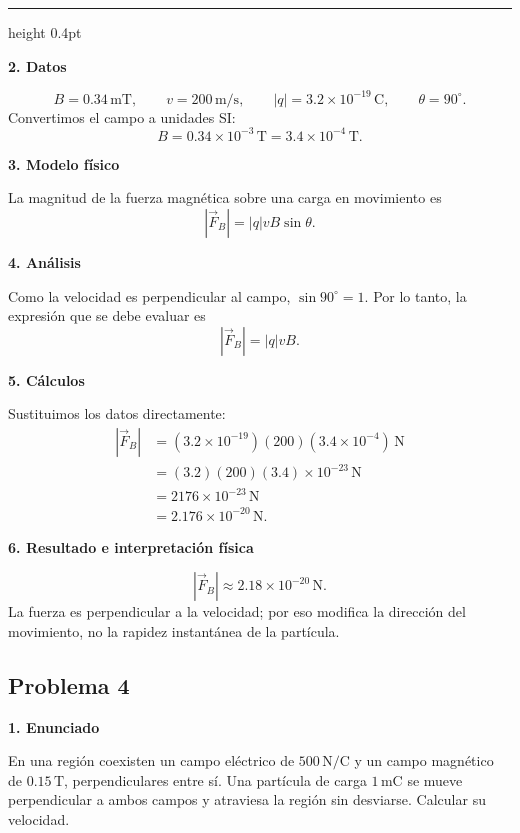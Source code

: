 \documentclass[11pt]{article}
\newcommand{\soluciontitulo}{%
  \par\medskip
  \noindent{\large\bfseries Solución.}\par
  \vspace{0.2em}\hrule height 0.4pt \vspace{0.7em}%
}
\newcommand{\paso}[1]{%
  \par\medskip
  \noindent\textbf{#1}\par
  \vspace{0.1em}%
}
\begin{document}
\soluciontitulo

\paso{2. Datos}
\begin{equation*}
    B=0.34\,\mathrm{mT},
    \qquad
    v=200\,\mathrm{m/s},
    \qquad
    |q|=3.2\times10^{-19}\,\mathrm C,
    \qquad
    \theta=90^\circ.
\end{equation*}
Convertimos el campo a unidades SI:
\begin{equation*}
    B=0.34\times10^{-3}\,\mathrm T=3.4\times10^{-4}\,\mathrm T.
\end{equation*}

\paso{3. Modelo f\'isico}
La magnitud de la fuerza magn\'etica sobre una carga en movimiento es
\begin{equation*}
    |\vec F_B|=|q|vB\sin\theta.
\end{equation*}

\paso{4. An\'alisis}
Como la velocidad es perpendicular al campo, $\sin90^\circ=1$. Por lo tanto, la expresi\'on que se debe evaluar es
\begin{equation*}
    |\vec F_B|=|q|vB.
\end{equation*}

\paso{5. C\'alculos}
Sustituimos los datos directamente:
\begin{align*}
    |\vec F_B|
    &=(3.2\times10^{-19})(200)(3.4\times10^{-4})\,\mathrm N\\
    &=(3.2)(200)(3.4)\times10^{-23}\,\mathrm N\\
    &=2176\times10^{-23}\,\mathrm N\\
    &=2.176\times10^{-20}\,\mathrm N.
\end{align*}

\paso{6. Resultado e interpretaci\'on f\'isica}
\begin{equation*}
    \boxed{|\vec F_B|\approx2.18\times10^{-20}\,\mathrm N}.
\end{equation*}
La fuerza es perpendicular a la velocidad; por eso modifica la direcci\'on del movimiento, no la rapidez instant\'anea de la part\'icula.

\newpage

\subsection*{Problema 4}
\paso{1. Enunciado}
En una regi\'on coexisten un campo el\'ectrico de $500\,\mathrm{N/C}$ y un campo magn\'etico de $0.15\,\mathrm T$, perpendiculares entre s\'i. Una part\'icula de carga $1\,\mathrm{mC}$ se mueve perpendicular a ambos campos y atraviesa la regi\'on sin desviarse. Calcular su velocidad.
\end{document}
